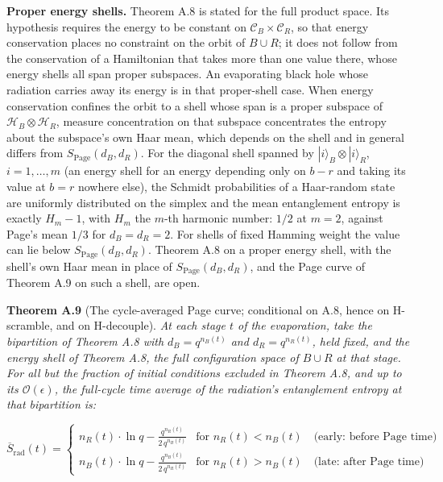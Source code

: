 \documentclass[
]{article}
\begin{document}
\textbf{Proper energy shells.} Theorem A.8 is stated for the full
product space. Its hypothesis requires the energy to be constant on
\(\mathcal{C}_B \times \mathcal{C}_R\), so that energy conservation
places no constraint on the orbit of \(B \cup R\); it does not follow
from the conservation of a Hamiltonian that takes more than one value
there, whose energy shells all span proper subspaces. An evaporating
black hole whose radiation carries away its energy is in that
proper-shell case. When energy conservation confines the orbit to a
shell whose span is a proper subspace of
\(\mathcal{H}_B \otimes \mathcal{H}_R\), measure concentration on that
subspace concentrates the entropy about the subspace's own Haar mean,
which depends on the shell and in general differs from
\(S_{\text{Page}}(d_B, d_R)\). For the diagonal shell spanned by
\(|i\rangle_B \otimes |i\rangle_R\), \(i = 1, \ldots, m\) (an energy
shell for an energy depending only on \(b - r\) and taking its value at
\(b = r\) nowhere else), the Schmidt probabilities of a Haar-random
state are uniformly distributed on the simplex and the mean entanglement
entropy is exactly \(H_m - 1\), with \(H_m\) the \(m\)-th harmonic
number: \(1/2\) at \(m = 2\), against Page's mean \(1/3\) for
\(d_B = d_R = 2\). For shells of fixed Hamming weight the value can lie
below \(S_{\text{Page}}(d_B, d_R)\). Theorem A.8 on a proper energy
shell, with the shell's own Haar mean in place of
\(S_{\text{Page}}(d_B, d_R)\), and the Page curve of Theorem A.9 on such
a shell, are open.

\textbf{Theorem A.9} (The cycle-averaged Page curve; conditional on A.8,
hence on H-scramble, and on H-decouple). \emph{At each stage \(t\) of
the evaporation, take the bipartition of Theorem A.8 with
\(d_B = q^{n_B(t)}\) and \(d_R = q^{n_R(t)}\), held fixed, and the
energy shell of Theorem A.8, the full configuration space of
\(B \cup R\) at that stage. For all but the fraction of initial
conditions excluded in Theorem A.8, and up to its
\(\mathcal{O}(\epsilon)\), the full-cycle time average of the
radiation's entanglement entropy at that bipartition is:}

\[\overline{S}_{\text{rad}}(t) = \begin{cases} n_R(t) \cdot \ln q - \frac{q^{n_R(t)}}{2\,q^{n_B(t)}} & \text{for } n_R(t) < n_B(t) \quad \text{(early: before Page time)} \\ n_B(t) \cdot \ln q - \frac{q^{n_B(t)}}{2\,q^{n_R(t)}} & \text{for } n_R(t) > n_B(t) \quad \text{(late: after Page time)} \end{cases}\]
\end{document}
